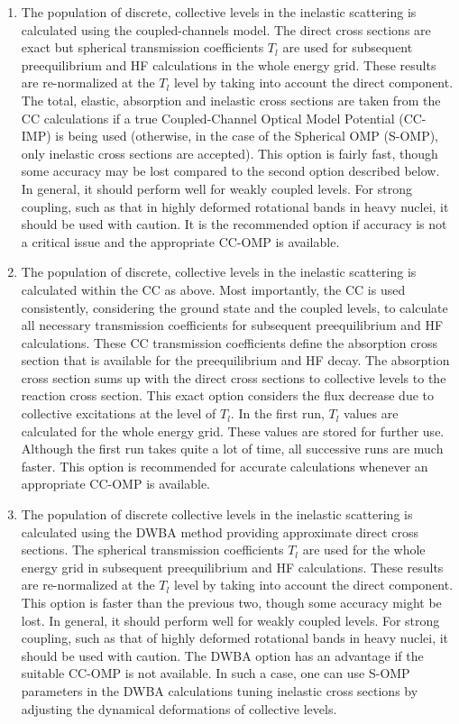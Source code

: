 \documentclass[twocolumn,amsmath,amssymb,10pt,groupedaddress,a4paper]{revtex4}
\begin{document}
\begin{enumerate}
\item The population of discrete, collective levels in the inelastic scattering
is calculated using the coupled-channels model. The direct cross sections
are exact but spherical transmission coefficients $T_{l}$ are used
for subsequent preequilibrium and HF calculations in the whole energy
grid. These results are re-normalized at the $T_{l}$ level by taking
into account the direct component. The total, elastic, absorption and
inelastic cross sections are taken from the CC calculations if
a true Coupled-Channel Optical Model Potential (CC-IMP) is being used
(otherwise, in the case of the Spherical OMP (S-OMP), only inelastic
cross sections are accepted). This option is fairly fast, though some
accuracy may be lost compared to the second option described below.
In general, it should perform well for weakly coupled levels.
For strong coupling, such as that in highly deformed rotational bands
in heavy nuclei, it should be used with caution. It is the recommended
option if accuracy is not a critical issue and the appropriate CC-OMP
is available.
\item The population of discrete, collective levels in the inelastic scattering
is calculated within the CC as above. Most importantly, the CC is used
consistently, considering the ground state and the coupled levels,
to calculate all necessary transmission coefficients for subsequent
preequilibrium and HF calculations. These CC transmission coefficients
define the absorption cross section that is available for the preequilibrium
and HF decay. The absorption cross section sums up with the direct
cross sections to collective levels to the reaction cross section.
This exact option considers the flux decrease due to collective excitations
at the level of $T_{l}$. In the first run, $T_{l}$ values are calculated
for the whole energy grid. These values are stored for further use.
Although the first run takes quite a lot of time, all successive runs
are much faster. This option is recommended for accurate calculations
whenever an appropriate CC-OMP is available.
\item The population of discrete collective levels in the inelastic scattering
is calculated using the DWBA method providing approximate direct cross
sections. The spherical transmission coefficients $T_{l}$ are used
for the whole energy grid in subsequent preequilibrium and HF calculations.
These results are re-normalized at the $T_{l}$ level by taking into
account the direct component. This option is faster than the previous
two, though some accuracy might be lost. In general, it should perform
well for weakly coupled levels. For strong coupling, such as that of
highly deformed rotational bands in heavy nuclei, it should be
used with caution. The DWBA option has an advantage if the suitable
CC-OMP is not available. In such a case, one can use S-OMP parameters
in the DWBA calculations tuning inelastic cross sections by adjusting
the dynamical deformations of collective levels.
\end{enumerate}
\end{document}
